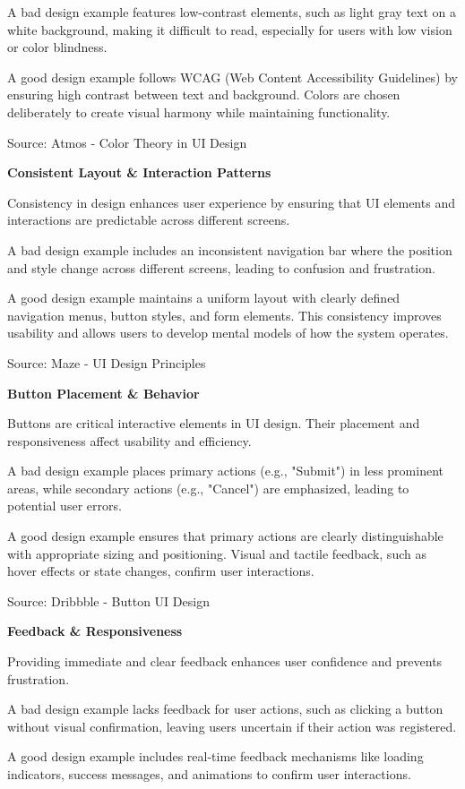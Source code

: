 A bad design example features low-contrast elements, such as light gray text on a white background, making it difficult to read, especially for users with low vision or color blindness.

A good design example follows WCAG (Web Content Accessibility Guidelines) by ensuring high contrast between text and background. Colors are chosen deliberately to create visual harmony while maintaining functionality.

Source: Atmos - Color Theory in UI Design

\textbf{Consistent Layout \& Interaction Patterns}

Consistency in design enhances user experience by ensuring that UI elements and interactions are predictable across different screens.

A bad design example includes an inconsistent navigation bar where the position and style change across different screens, leading to confusion and frustration.

A good design example maintains a uniform layout with clearly defined navigation menus, button styles, and form elements. This consistency improves usability and allows users to develop mental models of how the system operates.

Source: Maze - UI Design Principles

\textbf{Button Placement \& Behavior}

Buttons are critical interactive elements in UI design. Their placement and responsiveness affect usability and efficiency.

A bad design example places primary actions (e.g., "Submit") in less prominent areas, while secondary actions (e.g., "Cancel") are emphasized, leading to potential user errors.

A good design example ensures that primary actions are clearly distinguishable with appropriate sizing and positioning. Visual and tactile feedback, such as hover effects or state changes, confirm user interactions.

Source: Dribbble - Button UI Design

\textbf{Feedback \& Responsiveness}

Providing immediate and clear feedback enhances user confidence and prevents frustration.

A bad design example lacks feedback for user actions, such as clicking a button without visual confirmation, leaving users uncertain if their action was registered.

A good design example includes real-time feedback mechanisms like loading indicators, success messages, and animations to confirm user interactions.

